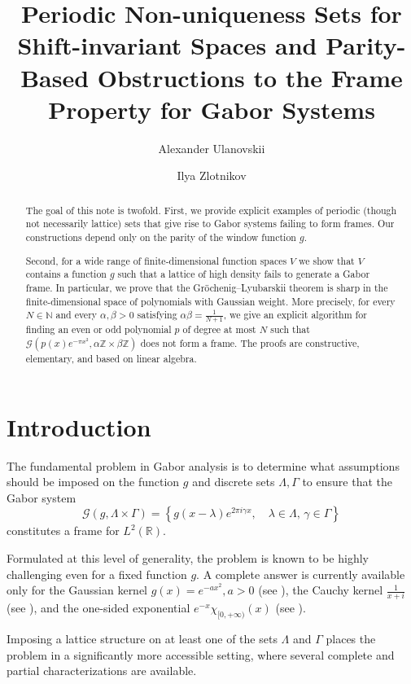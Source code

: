 \documentclass[12pt]{amsart}
\author[Ulanovskii]{Alexander Ulanovskii}
\author[Zlotnikov]{Ilya Zlotnikov}
\title[Periodic Non-uniqueness Sets for Shift-invariant Spaces]{Periodic Non-uniqueness Sets for Shift-invariant Spaces and Parity-Based Obstructions to the Frame Property for  Gabor Systems}
\numberwithin{equation}{section}
\newcommand{\R}{{\mathbb R}} \newcommand{\Q}{{\mathbb Q}} \newcommand{\Z}{{\mathbb Z}} \newcommand{\N}{{\mathbb N}}
\begin{document}
\begin{abstract}

The goal of this note is twofold. First, we provide explicit examples of periodic (though not necessarily lattice) sets that give rise to Gabor systems failing to form frames. Our constructions depend only on the parity of the window function $g$.

Second, for a wide range of finite-dimensional function spaces $V$ we show that $V$ contains a function $g$ such that a lattice of high density fails to generate a Gabor frame. In particular, we prove that the Gröchenig--Lyubarskii theorem is sharp in the finite-dimensional space of polynomials with Gaussian weight. More precisely, for every $N\in\N$ and every $\alpha,\beta>0$ satisfying $\alpha\beta=\frac{1}{N+1}$, we give an explicit algorithm for finding an even or odd polynomial $p$ of degree at most $N$ such that
$
\mathcal{G}(p(x)e^{-\pi x^2}, \alpha\mathbb{Z} \times \beta\mathbb{Z})
$
does not form a frame. The proofs are constructive, elementary, and based on linear algebra.

\end{abstract}

 \date{}\maketitle

\section{Introduction}

The fundamental problem in Gabor analysis is to determine what assumptions should be imposed on the function $g$ and discrete sets $\Lambda, \Gamma$ to ensure that the Gabor system
$$
\mathcal{G}(g, \Lambda \times \Gamma) = \left\{g(x-\lambda) e^{2\pi i \gamma x}, \quad \lambda \in \Lambda, \,\gamma \in \Gamma \right\}
$$
constitutes a frame for $L^2(\R).$

Formulated at this level of generality, the problem is known to be highly challenging even for a fixed function $g$. A complete answer is currently available only for the Gaussian kernel $g(x) = e^{-ax^2}, a >0$ (see \cite{MR1188007, MR1173117}), the Cauchy kernel $\frac{1}{x+i}$ (see \cite{MR4345947}), and the one-sided exponential $e^{-x}\chi_{[0, +\infty)}(x)$ (see \cite{BELOV2026101892}).

Imposing a lattice structure on at least one of the sets $\Lambda$ and $\Gamma$ places the problem in a significantly more accessible setting, where several complete and partial characterizations are available.
\end{document}
